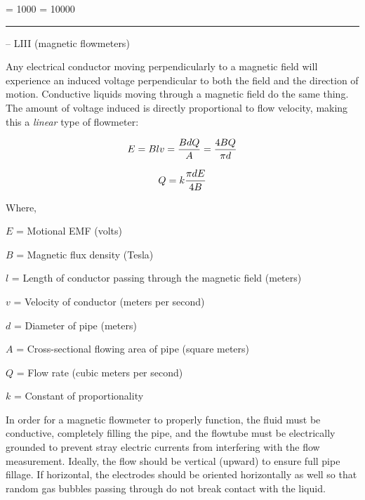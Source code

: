 



\tolerance = 1000
\pretolerance = 10000

\vskip 5pt \hrule \vskip 5pt  -- LIII (magnetic flowmeters) \vskip 10pt

Any electrical conductor moving perpendicularly to a magnetic field will experience an induced voltage perpendicular to both the field and the direction of motion.  Conductive liquids moving through a magnetic field do the same thing.  The amount of voltage induced is directly proportional to flow velocity, making this a {\it linear} type of flowmeter:

$$E = Blv = {B d Q \over A} = {4 B Q \over \pi d}$$

$$Q = k {\pi d E \over 4B}$$

\noindent
Where,

$E$ = Motional EMF (volts)

$B$ = Magnetic flux density (Tesla)

$l$ = Length of conductor passing through the magnetic field (meters)

$v$ = Velocity of conductor (meters per second)

$d$ = Diameter of pipe (meters)

$A$ = Cross-sectional flowing area of pipe (square meters)

$Q$ = Flow rate (cubic meters per second)

$k$ = Constant of proportionality

\vskip 10pt

In order for a magnetic flowmeter to properly function, the fluid must be conductive, completely filling the pipe, and the flowtube must be electrically grounded to prevent stray electric currents from interfering with the flow measurement.  Ideally, the flow should be vertical (upward) to ensure full pipe fillage.  If horizontal, the electrodes should be oriented horizontally as well so that random gas bubbles passing through do not break contact with the liquid.

\vskip 10pt

